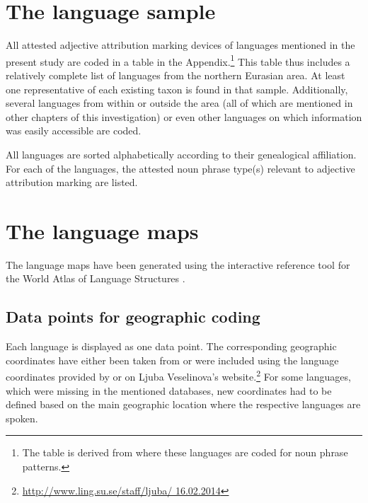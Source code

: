 \section{The language sample}
All attested adjective attribution marking devices of languages mentioned in the present study are coded in a table in the Appendix.\footnote{The table is derived from \citet{AUTOTYP-NP} where these languages are coded for noun phrase patterns.} This table thus includes a relatively complete list of languages from the northern Eurasian area. At least one representative of each existing taxon is found in that sample. Additionally, several languages from within or outside the area (all of which are mentioned in other chapters of this investigation) or even other languages on which information was easily accessible are coded.

All languages are sorted alphabetically according to their genealogical affiliation. For each of the languages, the attested noun phrase type(s) relevant to adjective attribution marking are listed.

\section{The language maps}
The language maps have been generated using the interactive reference tool 
for the World Atlas of Language Structures \citep{bibiko2005}. 

\subsection[Geographic coding]{Data points for geographic coding}
Each language is displayed as one data point. The corresponding geographic coordinates have either been taken from \cite{walsOnline2013} or were included using the language coordinates provided by \cite{AUTOTYP} or on Ljuba Veselinova's website.\footnote{\url{http://www.ling.su.se/staff/ljuba/ 16.02.2014}} For some languages, which were missing in the mentioned databases, new coordinates had to be defined based on the main geographic location where the respective languages are spoken.

